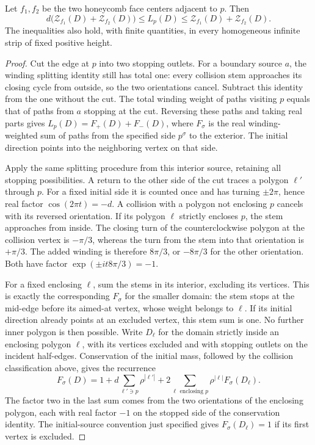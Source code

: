 \begin{lemma}\label{lem:02-length-nests}\label{E:length-nest}
Let $f_1,f_2$ be the two honeycomb face centers adjacent to $p$. Then
\[
 d\bigl(\mathcal Z_{f_1}(D)+\mathcal Z_{f_2}(D)\bigr)
 \le L_p(D)\le
 \mathcal Z_{f_1}(D)+\mathcal Z_{f_2}(D).
\]
The inequalities also hold, with finite quantities, in every homogeneous
infinite strip of fixed positive height.
\end{lemma}
\begin{proof}
Cut the edge at $p$ into two stopping outlets. For a boundary source
$a$, the winding splitting identity still has total one: every collision
stem approaches its closing cycle from outside, so the two orientations
cancel. Subtract this identity from the one without the cut. The total
winding weight of paths visiting $p$ equals that of paths from $a$
stopping at the cut. Reversing these paths and taking real parts gives
$L_p(D)=F_+(D)+F_-(D)$, where $F_\sigma$ is the real winding-weighted
sum of paths from the specified side $p^\sigma$ to the exterior. The
initial direction points into the neighboring vertex on that side.

Apply the same splitting procedure from this interior source, retaining
all stopping possibilities. A return to the other side of the cut traces
a polygon $\ell'$ through $p$. For a fixed initial side it is counted
once and has turning $\pm2\pi$, hence real factor
$\cos(2\pi t)=-d$. A collision with a polygon not enclosing $p$
cancels with its reversed orientation. If its polygon $\ell$ strictly
encloses $p$, the stem approaches from inside. The closing turn of the
counterclockwise polygon at the collision vertex is $-\pi/3$, whereas
the turn from the stem into that orientation is $+\pi/3$. The added
winding is therefore $8\pi/3$, or $-8\pi/3$ for the other orientation.
Both have factor $\exp(\pm it8\pi/3)=-1$.

For a fixed enclosing $\ell$, sum the stems in its interior, excluding
its vertices. This is exactly the corresponding $F_\sigma$ for the
smaller domain: the stem stops at the mid-edge before its aimed-at
vertex, whose weight belongs to $\ell$. If its initial direction already
points at an excluded vertex, this stem sum is one. No further inner
polygon is then possible. Write \(D_\ell\) for the domain strictly inside an enclosing polygon
\(\ell\), with its vertices excluded and with stopping outlets on the
incident half-edges. Conservation of the initial mass, followed by the
collision classification above, gives the recurrence
\[
 F_\sigma(D)=1+d\sum_{\ell'\ni p}\rho^{|\ell'|}
       +2\sum_{\ell\text{ enclosing }p}\rho^{|\ell|}F_\sigma(D_\ell).
\]
The factor two in the last sum comes from the two orientations of the
enclosing polygon, each with real factor \(-1\) on the stopped side
of the conservation identity. The initial-source convention just
specified gives \(F_\sigma(D_\ell)=1\) if its first vertex is excluded.


\end{proof}

